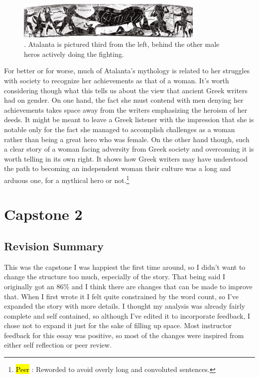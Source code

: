 \documentclass[letterpaper, reqno,11pt]{article}
\newcommand{\hlc}[2][yellow]{{%
    \colorlet{foo}{#1}%
    \sethlcolor{foo}\hl{#2}}%
}
\begin{document}
\begin{figure}[tpb]
  \centering
  \includegraphics[width=0.8\textwidth]{atalanta}
  \caption{\cite{boar}. Atalanta is pictured third from the left, behind the other male heros actively doing the fighting.}
  \label{fig:atalanta}
\end{figure}


\medskip

For better or for worse, much of Atalanta's mythology is related to her struggles with society to recognize her achievements as that of a woman. It's worth considering though what this tells us about the view that ancient Greek writers had on gender. On one hand, the fact she must contend with men denying her achievements takes space away from the writers emphasizing the heroism of her deeds. It might be meant to leave a Greek listener with the impression that she is notable only for the fact she managed to accomplish challenges as a woman rather than being a great hero who was female. On the other hand though, such a clear story of a woman facing adversity from Greek society and overcoming it is worth telling in its own right. It shows how Greek writers may have understood the path to becoming an independent woman their culture was a long and arduous one, for a mythical hero or not.\footnote{\hlc[BurntOrange]{Peer}: Reworded to avoid overly long and convoluted sentences.}

\pagebreak

\section*{Capstone 2}

\subsection*{Revision Summary}

This was the capstone I was happiest the first time around, so I didn't want to change the structure too much, especially of the story. That being said I originally got an 86\% and I think there are changes that can be made to improve that. When I first wrote it I felt quite constrained by the word count, so I've expanded the story with more details. I thought my analysis was already fairly complete and self contained, so although I've edited it to incorporate feedback, I chose not to expand it just for the sake of filling up space. Most instructor feedback for this essay was positive, so most of the changes were inspired from either self reflection or peer review.
\end{document}
